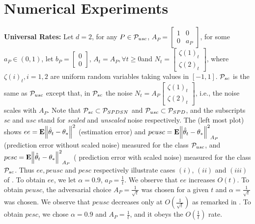 \section{Numerical Experiments}\label{sec:exp}

\textbf{Universal Rates:} Let $d=2$, for any $P\in \P_{usc}$, $A_P=\left[\begin{matrix}1 &0\\ 0 & a_P\end{matrix}\right]$, for some $a_P\in (0,1)$, let $b_P=\left[\begin{matrix}0\\0\end{matrix}\right]$, $A_t=A_P,\forall t\geq 0$and $N_t=\left[\begin{matrix}\zeta(1)_t\\ \zeta(2)_t\end{matrix}\right]$, where $\zeta(i)_t, i=1,2$ are \iid uniform random variables taking values in $[-1,1]$. $\P_{sc}$ is the same as $\P_{usc}$ except that, in $\P_{sc}$ the noise $N_t=A_P \left[\begin{matrix}\zeta(1)_t\\ \zeta(2)_t\end{matrix}\right]$, i.e., the noise scales with $A_P$. Note that $\P_{sc}\subset \P_{SPDSN}$ and $\P_{usc}\subset \P_{SPD}$, and the subscripts $sc$ and $usc$ stand for \emph{scaled} and \emph{unscaled} noise respectively. 
The  (left most plot) shows $ee=\E{\norm{\thh_t-\ts}^2}$ (estimation error) and $peusc=\E{\norm{\thh_t-\ts}^2}_{A_P}$ (prediction error without scaled noise) measured for the class $\P_{usc}$,  and $pesc=\E{\norm{\thh_t-\ts}^2}_{A_P}$ ( prediction error with scaled noise)  measured for the class $\P_{sc}$. Thus $ee, peusc$ and $pesc$ respectively illustrate cases $(i)$, $(ii)$ and $(iii)$ of . To obtain $ee$, we let $\alpha=0.9$, $a_P=\frac{1}{t}$. We observe that $ee$ increases $O(t)$. To obtain $peusc$, the adversarial choice $A_P=\frac{1}{\sqrt{t}}$ was chosen for a given $t$ and $\alpha=\frac{1}{\sqrt{t}}$ was chosen. We observe that $peusc$ decreases only at $O(\frac{1}{\sqrt{t}})$ as remarked in . To obtain $pesc$, we chose $\alpha=0.9$ and $A_P=\frac{1}{t}$, and it obeys the $O(\frac{1}{t})$ rate.

